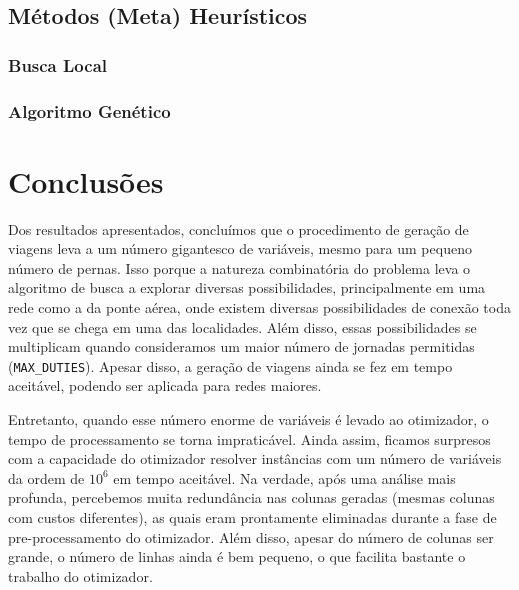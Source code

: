\documentclass[12pt,a4paper]{article}
\newcommand{\zerar}{\setcounter{equation}{0}\setcounter{figure}{0}\setcounter{table}{0}}
\begin{document}

\subsection{Métodos (Meta) Heurísticos}
\label{sec:resultados_heuristicas}


\subsubsection{Busca Local}
\label{sec:resultados_busca}


\subsubsection{Algoritmo Genético}
\label{sec:resultados_genetico}


\zerar
\section{Conclusões}
\label{sec:conclusoes}

Dos resultados apresentados, concluímos que o procedimento de geração de viagens leva a um número 
gigantesco de variáveis, mesmo para um pequeno número de pernas. Isso porque a natureza combinatória 
do problema leva o algoritmo de busca a explorar diversas possibilidades, principalmente em uma rede 
como a da ponte aérea, onde existem diversas possibilidades de conexão toda vez que se chega em uma
das localidades. Além disso, essas possibilidades se multiplicam quando consideramos um maior número
de jornadas permitidas (\verb|MAX_DUTIES|). Apesar disso, a geração de viagens ainda se fez em tempo 
aceitável, podendo ser aplicada para redes maiores. 

Entretanto, quando esse número enorme de variáveis é levado ao otimizador, o tempo de processamento 
se torna impraticável. Ainda assim, ficamos surpresos com a capacidade do otimizador resolver 
instâncias com um número de variáveis da ordem de $10^6$ em tempo aceitável. Na verdade, após uma
análise mais profunda, percebemos muita redundância nas colunas geradas (mesmas colunas com custos 
diferentes), as quais eram prontamente eliminadas durante a fase de pre-processamento do otimizador.
Além disso, apesar do número de colunas ser grande, o número de linhas ainda é bem pequeno, o que
facilita bastante o trabalho do otimizador.





 
\end{document}
